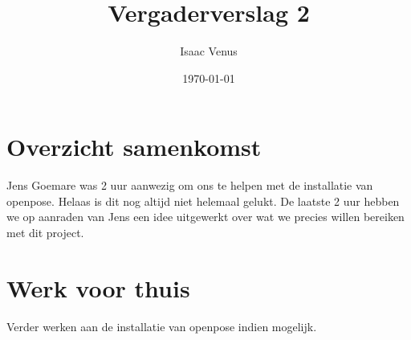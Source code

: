 \documentclass[a4paper,kulak]{kulakarticle} %
\date{\today}
\title{Vergaderverslag 2}
\author{Isaac Venus}
\begin{document}
\maketitle
\section{Overzicht samenkomst}
	Jens Goemare was 2 uur aanwezig om ons te helpen met de installatie van openpose. Helaas is dit nog altijd niet helemaal gelukt. De laatste 2 uur hebben we op aanraden van Jens een idee uitgewerkt over wat we precies willen bereiken met dit project.

\section{Werk voor thuis}
	Verder werken aan de installatie van openpose indien mogelijk.
\end{document}
